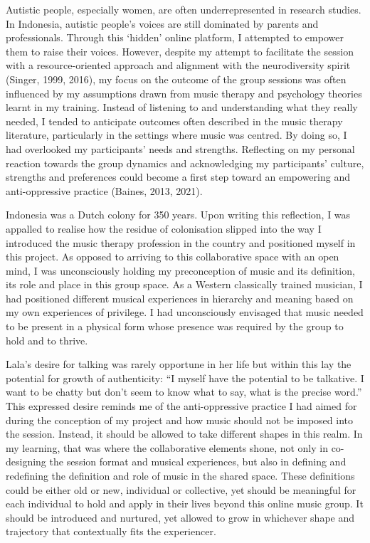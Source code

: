\documentclass[authordate, empirical, issue]{jote-new-article}
\begin{document}
Autistic people, especially women, are often underrepresented in research studies. In Indonesia, autistic people's voices are still dominated by parents and professionals. Through this ‘hidden' online platform, I attempted to empower them to raise their voices. However, despite my attempt to facilitate the session with a resource-oriented approach and alignment with the neurodiversity spirit (Singer, 1999, 2016), my focus on the outcome of the group sessions was often influenced by my assumptions drawn from music therapy and psychology theories learnt in my training. Instead of listening to and understanding what they really needed, I tended to anticipate outcomes often described in the music therapy literature, particularly in the settings where music was centred. By doing so, I had overlooked my participants' needs and strengths. Reflecting on my personal reaction towards the group dynamics and acknowledging my participants' culture, strengths and preferences could become a first step toward an empowering and anti-oppressive practice (Baines, 2013, 2021).



Indonesia was a Dutch colony for 350 years. Upon writing this reflection, I was appalled to realise how the residue of colonisation slipped into the way I introduced the music therapy profession in the country and positioned myself in this project. As opposed to arriving to this collaborative space with an open mind, I was unconsciously holding my preconception of music and its definition, its role and place in this group space. As a Western classically trained musician, I had positioned different musical experiences in hierarchy and meaning based on my own experiences of privilege. I had unconsciously envisaged that music needed to be present in a physical form whose presence was required by the group to hold and to thrive.



Lala's desire for talking was rarely opportune in her life but within this lay the potential for growth of authenticity: “I myself have the potential to be talkative. I want to be chatty but don't seem to know what to say, what is the precise word.” This expressed desire reminds me of the anti-oppressive practice I had aimed for during the conception of my project and how music should not be imposed into the session. Instead, it should be allowed to take different shapes in this realm. In my learning, that was where the collaborative elements shone, not only in co-designing the session format and musical experiences, but also in defining and redefining the definition and role of music in the shared space. These definitions could be either old or new, individual or collective, yet should be meaningful for each individual to hold and apply in their lives beyond this online music group. It should be introduced and nurtured, yet allowed to grow in whichever shape and trajectory that contextually fits the experiencer.
\end{document}
